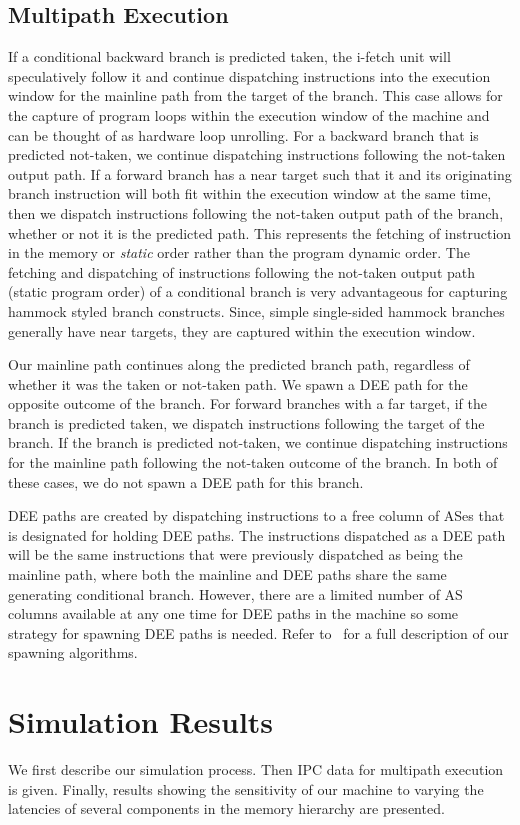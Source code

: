 \documentclass[10pt,twocolumn,dvips]{article}
\begin{document}
\subsection{Multipath Execution}
%
If a conditional backward branch is predicted taken,
the i-fetch unit
will speculatively follow it and continue dispatching instructions
into the execution window for the mainline path from the target
of the branch.  
This case allows for the capture of program loops
within the execution window of the machine and can be thought of
as hardware loop unrolling.
For a backward branch that
is predicted not-taken, we continue dispatching instructions following the
not-taken output path.
If a forward branch has a near target such
that it and its originating branch instruction will both
fit within the execution window at the same time, 
then we dispatch instructions following the
not-taken output path of the branch, whether or not it is the predicted path.
This represents the fetching of instruction in the 
memory or {\em static} order rather than the program dynamic order.
The fetching and dispatching of instructions following the
not-taken output path (static program order) of a conditional
branch is very advantageous for 
capturing hammock styled branch constructs.  
Since, simple single-sided hammock branches generally have near targets,
they are captured within the execution window.

Our mainline path continues along the predicted branch path,
regardless of whether it was the taken or not-taken path.  
We spawn a DEE path
for the opposite outcome of the branch.
For forward branches with a far target,
if the branch is predicted taken, we dispatch instructions following the target
of the branch.  
If the branch is predicted not-taken, we continue
dispatching instructions for the mainline path following the not-taken
outcome of the branch.  In both of these cases, we do not
spawn a DEE path for this branch.

DEE paths are created by dispatching instructions to a 
free column of ASes that is designated for holding DEE paths.
The instructions dispatched as a DEE path will be the same
instructions that were previously dispatched as being the
mainline path, where both the mainline and DEE paths share the
same generating conditional branch.
However, there are a limited number of AS columns
available at any one time for DEE paths in the machine so some
strategy for spawning DEE paths is needed.
Refer to~\cite{EPAR} for a full description of our spawning
algorithms.
%
%
\section{Simulation Results}
%
We first describe our simulation process.
Then IPC data for multipath execution
is given.
Finally, results showing the sensitivity of our machine
to varying the latencies of several components in the memory hierarchy
are presented.
%
%
\end{document}
